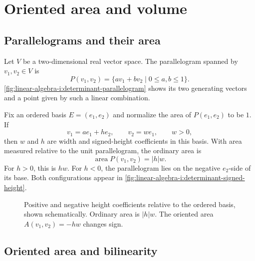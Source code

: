 \section{Oriented area and volume}
\label{sec:linear-algebra-i:oriented-area-and-volume}

\subsection{Parallelograms and their area}

Let \(V\) be a two-dimensional real vector space. The parallelogram spanned
by \(v_1,v_2\in V\) is
\[
  P(v_1,v_2)=\{av_1+bv_2\mid 0\leq a,b\leq1\}.
\]
\autoref{fig:linear-algebra-i:determinant-parallelogram} shows its two
generating vectors and a point given by such a linear combination.

\begin{marginfigure}
  \centering
  
  \caption[Parallelogram spanned by two vectors]{A parallelogram spanned by \(v_1,v_2\), shown schematically.
    The interior point has the form \(av_1+bv_2\).}
  \label{fig:linear-algebra-i:determinant-parallelogram}
\end{marginfigure}

Fix an ordered basis \(E=(e_1,e_2)\) and normalize the area of
\(P(e_1,e_2)\) to be \(1\). If
\[
  v_1=ae_1+he_2,\qquad v_2=we_1,\qquad w>0,
\]
then \(w\) and \(h\) are width and signed-height coefficients in this
basis. With area measured relative to the unit parallelogram, the ordinary
area is
\[
  \operatorname{area}P(v_1,v_2)=|h|w.
\]
For \(h>0\), this is \(hw\). For \(h<0\), the parallelogram lies on
the negative \(e_2\)-side of its base. Both configurations appear in
\autoref{fig:linear-algebra-i:determinant-signed-height}.

\begin{figure}[htbp]
  \centering
  
  \caption[Signed height and oriented area]{Positive and negative height coefficients relative to the
    ordered basis, shown schematically. Ordinary area is \(|h|w\).
    The oriented area \(A(v_1,v_2)=-hw\) changes sign.}
  \label{fig:linear-algebra-i:determinant-signed-height}
\end{figure}

\subsection{Oriented area and bilinearity}


